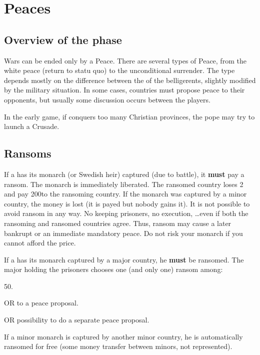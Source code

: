 
\chapter{Peaces}\label{chapter:Peace}

\section{Overview of the phase}

\aparag[Peace] Wars can be ended only by a Peace. There are several types of
Peace, from the white peace (return to statu quo) to the unconditional
surrender. The type depends mostly on the difference between the \STAB of the
belligerents, slightly modified by the military situation. In some cases,
countries must propose peace to their opponents, but usually some discussion
occurs between the players.

\aparag[Crusade] In the early game, if \TUR conquers too many Christian
provinces, the pope may try to launch a Crusade.

\aparag[Sequence.]
\PeaceDetails

\section{Ransoms}\label{chPeace:Ransoms}
\aparag[Majors] If a \MAJ has its monarch (or Swedish heir) captured (due to
battle), it \textbf{must} pay a ransom. The monarch is immediately liberated.
\bparag The ransomed country loses 2 \STAB and pay 200\ducats to the ransoming
country.
\bparag If the monarch was captured by a minor country, the money is lost
(it is payed but nobody gains it).
\bparag It is not possible to avoid ransom in any way. No keeping prisoners,
no execution, \ldots even if both the ransoming and ransomed countries agree.
\bparag Thus, ransom may cause a later bankrupt or an immediate mandatory
peace. Do not risk your monarch if you cannot afford the price.

\aparag[Minors] If a \MIN has its monarch captured by a major country, he
\textbf{must} be ransomed.
\bparag The major holding the prisoners chooses one (and only one) ransom
among:
\begin{modlist}
\item 50\ducats.
\item[OR]  to a peace proposal.
\item[OR] possibility to do a separate peace proposal.
\end{modlist}
\bparag If a minor monarch is captured by another minor country, he is
automatically ransomed for free (some money transfer between minors, not
represented).


